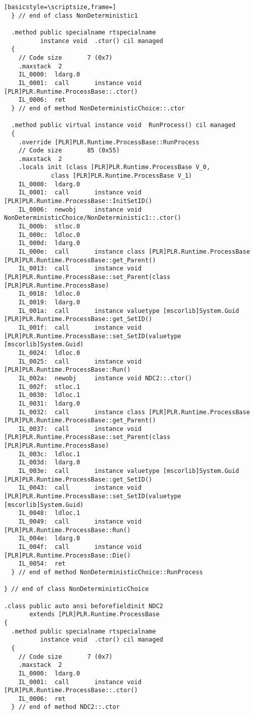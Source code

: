 \begin{lstlisting}[basicstyle=\scriptsize,frame=]
  } // end of class NonDeterministic1

  .method public specialname rtspecialname 
          instance void  .ctor() cil managed
  {
    // Code size       7 (0x7)
    .maxstack  2
    IL_0000:  ldarg.0
    IL_0001:  call       instance void [PLR]PLR.Runtime.ProcessBase::.ctor()
    IL_0006:  ret
  } // end of method NonDeterministicChoice::.ctor

  .method public virtual instance void  RunProcess() cil managed
  {
    .override [PLR]PLR.Runtime.ProcessBase::RunProcess
    // Code size       85 (0x55)
    .maxstack  2
    .locals init (class [PLR]PLR.Runtime.ProcessBase V_0,
             class [PLR]PLR.Runtime.ProcessBase V_1)
    IL_0000:  ldarg.0
    IL_0001:  call       instance void [PLR]PLR.Runtime.ProcessBase::InitSetID()
    IL_0006:  newobj     instance void NonDeterministicChoice/NonDeterministic1::.ctor()
    IL_000b:  stloc.0
    IL_000c:  ldloc.0
    IL_000d:  ldarg.0
    IL_000e:  call       instance class [PLR]PLR.Runtime.ProcessBase [PLR]PLR.Runtime.ProcessBase::get_Parent()
    IL_0013:  call       instance void [PLR]PLR.Runtime.ProcessBase::set_Parent(class [PLR]PLR.Runtime.ProcessBase)
    IL_0018:  ldloc.0
    IL_0019:  ldarg.0
    IL_001a:  call       instance valuetype [mscorlib]System.Guid [PLR]PLR.Runtime.ProcessBase::get_SetID()
    IL_001f:  call       instance void [PLR]PLR.Runtime.ProcessBase::set_SetID(valuetype [mscorlib]System.Guid)
    IL_0024:  ldloc.0
    IL_0025:  call       instance void [PLR]PLR.Runtime.ProcessBase::Run()
    IL_002a:  newobj     instance void NDC2::.ctor()
    IL_002f:  stloc.1
    IL_0030:  ldloc.1
    IL_0031:  ldarg.0
    IL_0032:  call       instance class [PLR]PLR.Runtime.ProcessBase [PLR]PLR.Runtime.ProcessBase::get_Parent()
    IL_0037:  call       instance void [PLR]PLR.Runtime.ProcessBase::set_Parent(class [PLR]PLR.Runtime.ProcessBase)
    IL_003c:  ldloc.1
    IL_003d:  ldarg.0
    IL_003e:  call       instance valuetype [mscorlib]System.Guid [PLR]PLR.Runtime.ProcessBase::get_SetID()
    IL_0043:  call       instance void [PLR]PLR.Runtime.ProcessBase::set_SetID(valuetype [mscorlib]System.Guid)
    IL_0048:  ldloc.1
    IL_0049:  call       instance void [PLR]PLR.Runtime.ProcessBase::Run()
    IL_004e:  ldarg.0
    IL_004f:  call       instance void [PLR]PLR.Runtime.ProcessBase::Die()
    IL_0054:  ret
  } // end of method NonDeterministicChoice::RunProcess

} // end of class NonDeterministicChoice

.class public auto ansi beforefieldinit NDC2
       extends [PLR]PLR.Runtime.ProcessBase
{
  .method public specialname rtspecialname 
          instance void  .ctor() cil managed
  {
    // Code size       7 (0x7)
    .maxstack  2
    IL_0000:  ldarg.0
    IL_0001:  call       instance void [PLR]PLR.Runtime.ProcessBase::.ctor()
    IL_0006:  ret
  } // end of method NDC2::.ctor


\end{lstlisting}
